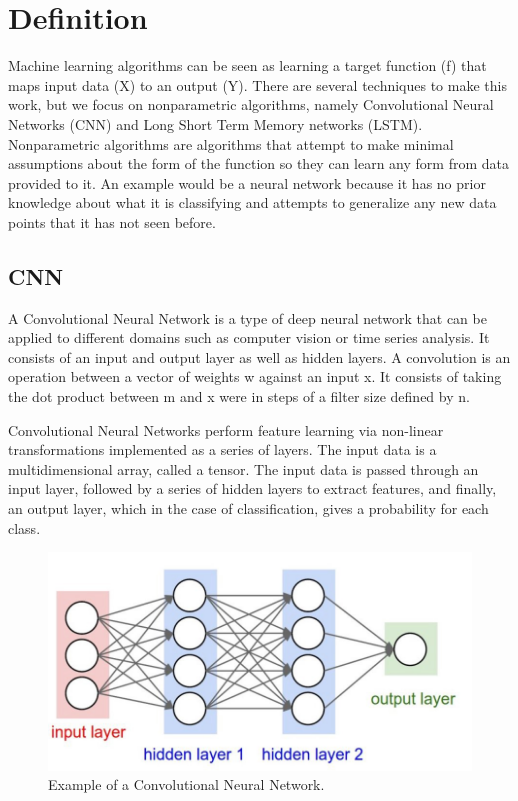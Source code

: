 \documentclass{turabian-thesis}
\newcounter{case}[section]
\begin{document}


\section{Definition}
Machine learning algorithms can be seen as learning a target function (f) that maps input data (X) to an output (Y). There are several techniques to make this work, but we focus on nonparametric algorithms, namely Convolutional Neural Networks (CNN) and Long Short Term Memory networks (LSTM). Nonparametric algorithms are algorithms that attempt to make minimal assumptions about the form of the function so they can learn any form from data provided to it. An example would be a neural network because it has no prior knowledge about what it is classifying and attempts to generalize any new data points that it has not seen before.

\subsection{CNN}

A Convolutional Neural Network is a type of deep neural network that can be applied to different domains such as computer vision or time series analysis. It consists of an input and output layer as well as hidden layers. A convolution is an operation between a vector of weights w against an input x. It consists of taking the dot product between m and x were in steps of a filter size defined by n.

Convolutional Neural Networks perform feature learning via non-linear transformations implemented as a series of layers. The input data is a multidimensional array, called a tensor. The input data is passed through an input layer, followed by a series of hidden layers to extract features, and finally, an output layer, which in the case of classification, gives a probability for each class. 

\begin{figure}[h!]
   \begin{center}
      \includegraphics[scale=0.3]{../media/nn_highlight.jpeg}
   \end{center}
   \caption{Example of a Convolutional Neural Network.}
   \label{fig:reinforcementAgent}
\end{figure}
\end{document}
